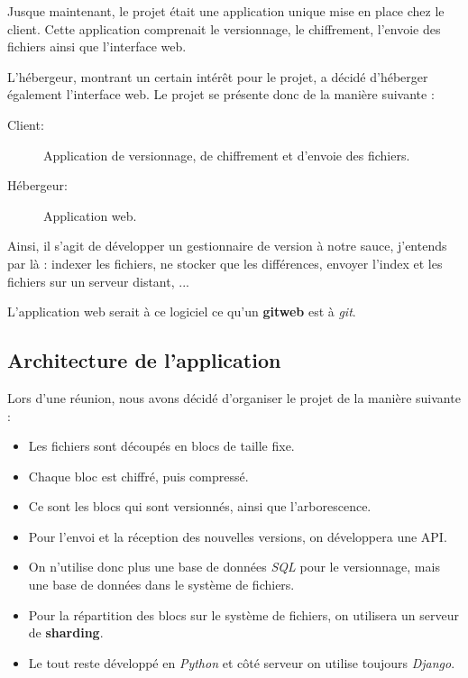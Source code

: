 Jusque maintenant, le projet était une application unique mise en place chez le client.
Cette application comprenait le versionnage, le chiffrement, l'envoie des fichiers ainsi
que l'interface web.

L'hébergeur, montrant un certain intérêt pour le projet, a décidé d'héberger également
l'interface web. Le projet se présente donc de la manière suivante :

\begin{description}
     \item[Client:] Application de versionnage, de chiffrement et d'envoie des fichiers.
     \item[Hébergeur:] Application web.
\end{description}

Ainsi, il s'agit de développer un gestionnaire de version à notre sauce, j'entends par là :
indexer les fichiers, ne stocker que les différences, envoyer l'index et les fichiers sur un
serveur distant, ...

L'application web serait à ce logiciel ce qu'un \textbf{gitweb} est à \textit{git}.

\subsection{Architecture de l'application}

Lors d'une réunion, nous avons décidé d'organiser le projet de la manière suivante :

\begin{itemize}
     \item Les fichiers sont découpés en blocs de taille fixe.
     \item Chaque bloc est chiffré, puis compressé.
     \item Ce sont les blocs qui sont versionnés, ainsi que l'arborescence.
     \item Pour l'envoi et la réception des nouvelles versions, on développera une API.
     \item On n'utilise donc plus une base de données \textit{SQL} pour le versionnage, mais une base de données
     dans le système de fichiers.
     \item Pour la répartition des blocs sur le système de fichiers, on utilisera un serveur de \textbf{sharding}.
     \item Le tout reste développé en \textit{Python} et côté serveur on utilise toujours \textit{Django}.
\end{itemize}

